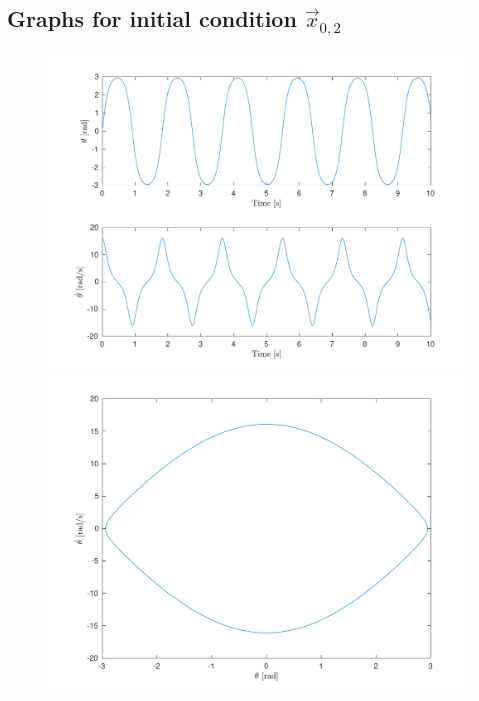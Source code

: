 \documentclass[10pt]{article}
\begin{document}
\subsection{Graphs for initial condition \texorpdfstring{$\vec{x}_{0,2}$}{x02}}
\begin{figure}[ht]
    \centering
    \begin{minipage}[b]{0.45\textwidth}
        \centering
        \includegraphics[width=1\linewidth]{lab1/figs/section3_x0_2_state_evolution.pdf}
    \end{minipage}
    \begin{minipage}[b]{0.45\textwidth}
        \centering
        \includegraphics[width=1\linewidth]{lab1/figs/section3_x0_2_state_orbit.pdf}
    \end{minipage}
    
    \label{figure:x_0_2_state_evolution}
\end{figure}
\end{document}
